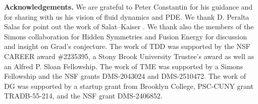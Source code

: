 \documentclass[11pt]{article}
\theoremstyle{plain}
\numberwithin{equation}{section}
\theoremstyle{remark}
\begin{document}
\vspace{2mm}

\noindent \textbf{Acknowledgements.}  We are grateful to Peter Constantin for his guidance and for sharing with us his vision of fluid dynamics and PDE.  We thank D. Peralta Salas for point out the work of Salat--Kaiser \cite{SK95,KS97}. We thank also the members of the Simons collaboration for Hidden Symmetries and Fusion Energy for discussion and insight on Grad's conjecture.  The work of TDD was supported by the NSF CAREER award \#2235395, a Stony Brook University Trustee’s award as well as an Alfred P. Sloan Fellowship. The work of TME was supported by a Simons Fellowship and the NSF grants DMS-2043024 and DMS-2510472.  The work of DG was supported by a startup grant from Brooklyn College, PSC-CUNY grant TRADB-55-214, and the NSF grant DMS-2406852. 
\end{document}
